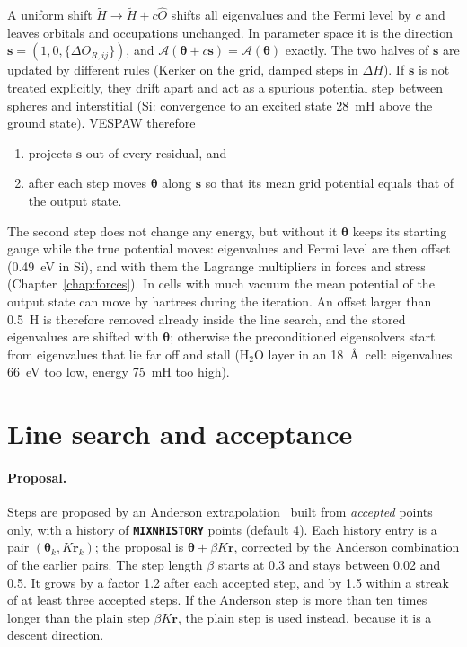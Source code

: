 \documentclass[11pt,a4paper,oneside]{book}
\newcommand{\vth}{\bm\theta}
\newcommand{\key}[1]{\textbf{\texttt{#1}}}
\begin{document}
A uniform shift $\tilde H\to\tilde H+c\hat O$ shifts all eigenvalues and
the Fermi level by $c$ and leaves orbitals and occupations unchanged. In
parameter space it is the direction $\bm s=(1,0,\{\Delta O_{R,ij}\})$, and
$\mathcal A(\vth+c\bm s)=\mathcal A(\vth)$ exactly. The two halves of
$\bm s$ are updated by different rules (Kerker on the grid, damped steps
in $\Delta H$). If $\bm s$ is not treated explicitly, they drift apart and
act as a spurious potential step between spheres and interstitial (Si:
convergence to an excited state 28~mH above the ground state). VESPAW
therefore
\begin{enumerate}
\item projects $\bm s$ out of every residual, and
\item after each step moves $\vth$ along $\bm s$ so that its mean grid
  potential equals that of the output state.
\end{enumerate}
The second step does not change any energy, but without it $\vth$ keeps
its starting gauge while the true potential moves: eigenvalues and Fermi
level are then offset (0.49~eV in Si), and with them the Lagrange
multipliers in forces and stress (Chapter~\ref{chap:forces}).
In cells with much vacuum the mean potential of the output state can
move by hartrees during the iteration. An offset larger than 0.5~H is
therefore removed already inside the line search, and the stored
eigenvalues are shifted with $\vth$; otherwise the preconditioned
eigensolvers start from eigenvalues that lie far off and stall (H$_2$O
layer in an 18~\AA\ cell: eigenvalues 66~eV too low, energy 75~mH too
high).

\section{Line search and acceptance}\label{sec:linesearch}

\paragraph{Proposal.} Steps are proposed by an Anderson
extrapolation~\cite{Anderson1965} built from \emph{accepted} points only,
with a history of \key{MIXNHISTORY} points (default 4). Each history
entry is a pair $(\vth_k,K\bm r_k)$; the proposal is
$\vth+\beta K\bm r$, corrected by the Anderson combination of the earlier
pairs. The step length $\beta$ starts at 0.3 and stays between 0.02 and
0.5. It grows by a factor 1.2 after each accepted step, and by 1.5
within a streak of at least three accepted steps. If the Anderson step
is more than ten times longer than the plain step $\beta K\bm r$, the
plain step is used instead, because it is a descent direction.
\end{document}
